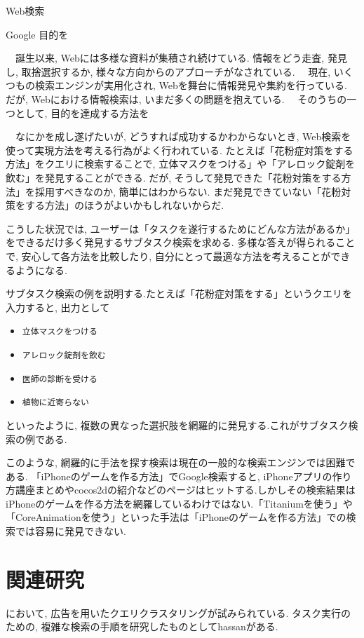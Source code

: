 \documentclass[submit,techreq]{ipsj}
\def\|{\verb|}
\begin{document}
Web検索

Google
目的を

　誕生以来, Webには多様な資料が集積され続けている. 情報をどう走査, 発見し, 取捨選択するか, 様々な方向からのアプローチがなされている. 
　現在, いくつもの検索エンジンが実用化され, Webを舞台に情報発見や集約を行っている. だが, Webにおける情報検索は, いまだ多くの問題を抱えている. 
　そのうちの一つとして, 目的を達成する方法を

　なにかを成し遂げたいが, どうすれば成功するかわからないとき, Web検索を使って実現方法を考える行為がよく行われている. たとえば「花粉症対策をする方法」をクエリに検索することで, 立体マスクをつける」や「アレロック錠剤を飲む」を発見することができる. だが, そうして発見できた「花粉対策をする方法」を採用すべきなのか, 簡単にはわからない. まだ発見できていない「花粉対策をする方法」のほうがよいかもしれないからだ.

こうした状況では, ユーザーは「タスクを遂行するためにどんな方法があるか」をできるだけ多く発見するサブタスク検索を求める. 多様な答えが得られることで, 安心して各方法を比較したり, 自分にとって最適な方法を考えることができるようになる.

サブタスク検索の例を説明する.たとえば「花粉症対策をする」というクエリを入力すると, 出力として


\begin{itemize}
\item \|立体マスクをつける|
\item \|アレロック錠剤を飲む|
\item \|医師の診断を受ける|
\item \|植物に近寄らない|
\end{itemize}


といったように, 複数の異なった選択肢を網羅的に発見する.これがサブタスク検索の例である.

このような, 網羅的に手法を探す検索は現在の一般的な検索エンジンでは困難である.
「iPhoneのゲームを作る方法」でGoogle検索すると, iPhoneアプリの作り方講座まとめやcocos2dの紹介などのページはヒットする.しかしその検索結果はiPhoneのゲームを作る方法を網羅しているわけではない.「Titaniumを使う」や「CoreAnimationを使う」といった手法は「iPhoneのゲームを作る方法」での検索では容易に発見できない.

\section{関連研究}

\cite{yamatake}において, 広告を用いたクエリクラスタリングが試みられている. タスク実行のための, 複雑な検索の手順を研究したものとして{hassan}がある.
\end{document}
